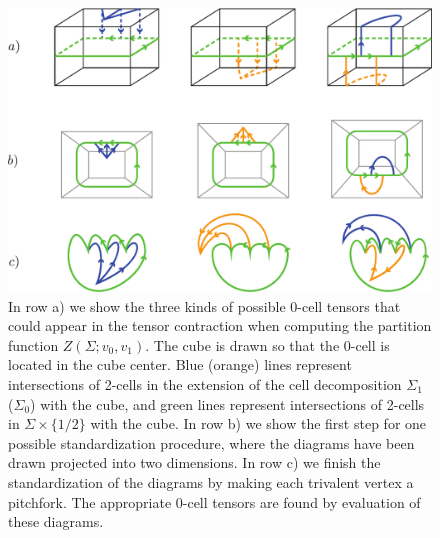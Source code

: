 \begin{figure}
\begin{center}
\includegraphics[scale=0.6]{StandardizedSlabTensors.pdf}
\caption{\label{StandardizedSlabTensors}
In row a) we show the three kinds of possible 0-cell tensors that could appear in the tensor contraction when 
computing the partition function $Z(\Sigma;v_0,v_1)$. The cube is drawn so that the 0-cell is located in the cube center. 
Blue (orange) lines represent intersections of 2-cells in the extension of the cell decomposition $\Sigma_1$ ($\Sigma_0$) with the cube, and 
green lines represent intersections of 2-cells in $\Sigma \times \{1/2\}$ with the cube. 
In row b) we show the first step for one possible standardization procedure, where the diagrams 
have been drawn projected into two dimensions. 
In row c) we finish the standardization of the diagrams by making each trivalent vertex a pitchfork. The appropriate 0-cell 
tensors are found by evaluation of these diagrams. 
}
\end{center}
\end{figure}

